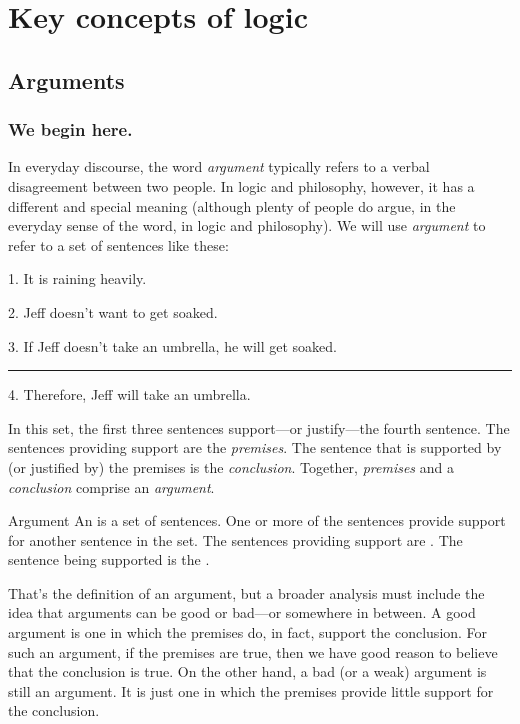 \part{Key concepts of logic}
\label{ch.intro}


\chapter{Arguments}
\label{s:Arguments}

\section{We begin here.}

In everyday discourse, the word \textit{argument} typically refers to a verbal disagreement between two people. In logic and philosophy, however, it has a different and special meaning (although plenty of people do argue, in the everyday sense of the word, in logic and philosophy). We will use \textit{argument} to refer to a set of sentences like these:
	\begin{earg}\label{argRaining}
		\item[1.] It is raining heavily. 
		\item[2.] Jeff doesn't want to get soaked.
		\item[3.] If Jeff doesn't take an umbrella, he will get soaked.
		      \vspace{0.1cm}
     			\hrule
      			\vspace{0.12cm}
		\item[4.] Therefore, Jeff will take an umbrella.
	\end{earg}
In this set, the first three sentences support---or justify---the fourth sentence. The sentences providing support are the \emph{premises}. The sentence that is supported by (or justified by) the premises is the \emph{conclusion}. Together, \textit{premises} and a \textit{conclusion} comprise an \textit{argument}.  

\begin{factboxy}{Argument}
An  is a set of sentences. One or more of the sentences provide support for another sentence in the set. The sentences providing support are . The sentence being supported is the .
\end{factboxy}

That's the definition of an argument, but a broader analysis must include the idea that arguments can be good or bad---or  somewhere in between. A good argument is one in which the premises do, in fact, support the conclusion. For such an argument, if the premises are true, then we have good reason to believe that the conclusion is true. On the other hand, a bad (or a weak) argument is still an argument. It is just one in which the premises provide little support for the conclusion.

